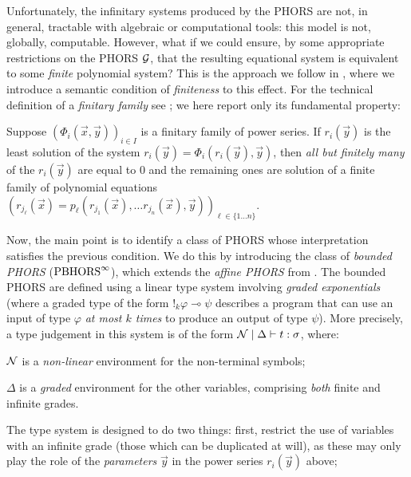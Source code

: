 \documentclass{easychair}
\begin{document}
Unfortunately, the infinitary systems produced by the PHORS are not, in general, tractable with algebraic or computational tools: this model is not, globally, computable. However, what if we could ensure, by some appropriate restrictions on the PHORS $\mathcal{G}$, that the resulting equational system is equivalent to some \emph{finite} polynomial system? This is the approach we follow  
in  \cite{lago2026higherorderprobabilisticverificationweighted}, where we introduce a semantic condition of \emph{finiteness} to this effect. For the technical definition of a \emph{finitary family} see \cite{lago2026higherorderprobabilisticverificationweighted}; we here report only its fundamental property:
\begin{prop}
	Suppose $(\Phi_i(\vec x, \vec y))_{i\in I}$ is a finitary family of power series. If $r_i(\vec y)$ is the least solution of 
	the system $r_i(\vec y)=\Phi_i(r_i(\vec y),\vec y)$, then \emph{all but finitely many} of the $r_i( \vec y)$ are equal to 0 and the remaining ones are solution of a finite family of {polynomial equations} $(r_{j_\ell}(\vec x) = p_\ell(r_{j_1}(\vec x), \dots r_{j_n}(\vec x), \vec y))_{\ell \in \{1 \dots n\}}$.
\end{prop}
Now, the main point is to identify a class of PHORS whose interpretation satisfies the previous condition.
We do this by introducing the class of \emph{bounded PHORS} ($\text{PBHORS}^{\infty}$), which extends the \emph{affine PHORS} from \cite{DBLP:conf/lics/LiMO22}. The bounded PHORS are defined using a linear type system involving \emph{graded exponentials} (where a graded type of the form $!_k\varphi\multimap \psi$ describes a program that can use an input of type $\varphi$ \emph{at most $k$ times} to produce an output of type $\psi$).
More precisely, a type judgement in this system is of the form $\mathcal{N}\mid \Delta\vdash t:\sigma$, where:
\begin{varitemize}
\item $\mathcal{N}$ is a \emph{non-linear} environment for the non-terminal symbols;
\item $\Delta$ is a \emph{graded} environment for the other variables, comprising \emph{both} finite and infinite grades.
\end{varitemize}
The type system is designed to do two things: first, restrict the use of variables with an infinite grade (those which can be duplicated at will), as these may only play the role of the \emph{parameters} $\vec y$ in the power series $r_i(\vec y)$ above; 
\end{document}

